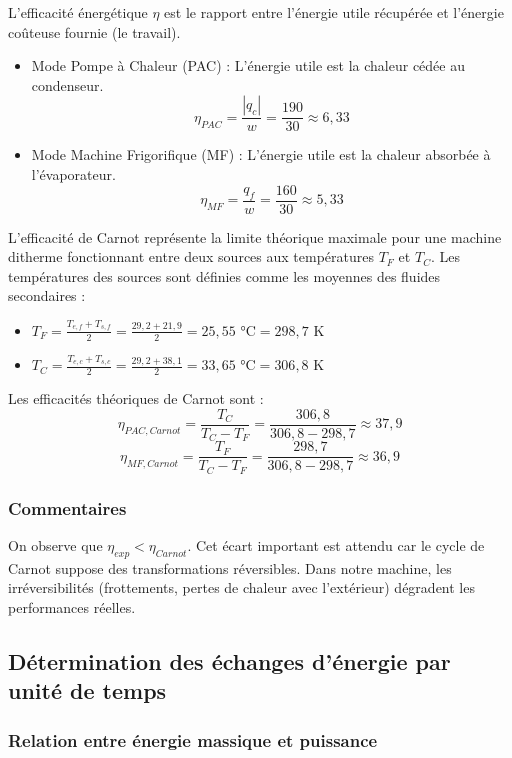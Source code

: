 \documentclass[a4paper,10pt,french]{scrartcl}
\begin{document}
L'efficacité énergétique $\eta$ est le rapport entre l'énergie utile récupérée et l'énergie coûteuse fournie (le travail).


\begin{itemize}
    \item {Mode Pompe à Chaleur (PAC) :} L'énergie utile est la chaleur cédée au condenseur.
    $$\eta_{PAC} = \frac{|q_c|}{w} = \frac{190}{30} \approx 6,33$$
    \item {Mode Machine Frigorifique (MF) :} L'énergie utile est la chaleur absorbée à l'évaporateur.
    $$\eta_{MF} = \frac{q_f}{w} = \frac{160}{30} \approx 5,33$$
\end{itemize}


L'efficacité de Carnot représente la limite théorique maximale pour une machine ditherme fonctionnant entre deux sources aux températures $T_F$ et $T_C$. Les températures des sources sont définies comme les moyennes des fluides secondaires :
\begin{itemize}
    \item $T_F = \frac{T_{e,f} + T_{s,f}}{2} = \frac{29,2 + 21,9}{2} = 25,55 \text{ °C} = 298,7 \text{ K}$
    \item $T_C = \frac{T_{e,c} + T_{s,c}}{2} = \frac{29,2 + 38,1}{2} = 33,65 \text{ °C} = 306,8 \text{ K}$
\end{itemize}

Les efficacités théoriques de Carnot sont :
$$\eta_{PAC, Carnot} = \frac{T_C}{T_C - T_F} = \frac{306,8}{306,8 - 298,7} \approx 37,9$$
$$\eta_{MF, Carnot} = \frac{T_F}{T_C - T_F} = \frac{298,7}{306,8 - 298,7} \approx 36,9$$

\subsubsection{Commentaires}
On observe que $\eta_{exp} < \eta_{Carnot}$. Cet écart important est attendu car le cycle de Carnot suppose des transformations réversibles. Dans notre machine, les irréversibilités (frottements, pertes de chaleur avec l'extérieur) dégradent les performances réelles.
\subsection{Détermination des échanges d'énergie par unité de temps}


\subsubsection{Relation entre énergie massique et puissance}
\end{document}
